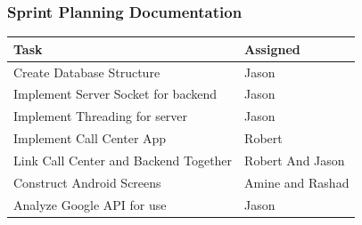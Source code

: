 \documentclass[a4paper,12pt]{article}
\begin{document}
\subsubsection{Sprint Planning Documentation}
\begin{tabular}{|p{9.5cm}|p{3.5cm}|}
\hline
Task & Assigned \\ \hline
Create Database Structure & Jason \\ \hline
Implement Server Socket for backend & Jason \\ \hline
Implement Threading for server & Jason \\ \hline
Implement Call Center App & Robert \\ \hline
Link Call Center and Backend Together & Robert And Jason \\ \hline
Construct Android Screens & Amine and Rashad \\ \hline
Analyze Google API for use & Jason \\ \hline
\end{tabular}
\end{document}
